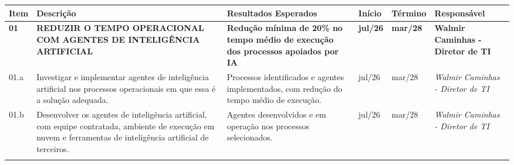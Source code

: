 \documentclass[12pt,a4paper]{article}
\newlength{\utilTab}
\newlength{\colItem}\newlength{\colDesc}\newlength{\colResul}
\newlength{\colIni}\newlength{\colFim}\newlength{\colResp}
\begin{document}
\begingroup
\footnotesize\singlespacing
{}
\setlength{\arrayrulewidth}{0.5pt}
\setlength{\tabcolsep}{1pt}
\renewcommand{\arraystretch}{1.35}
\setlength{\utilTab}{\dimexpr\textwidth-12\tabcolsep-7\arrayrulewidth\relax}
\setlength{\colItem}{0.04764\utilTab}
\setlength{\colDesc}{0.43812\utilTab}
\setlength{\colResul}{0.21902\utilTab}
\setlength{\colIni}{0.05409\utilTab}
\setlength{\colFim}{0.06101\utilTab}
\setlength{\colResp}{\dimexpr\utilTab-\colItem-\colDesc-\colResul-\colIni-\colFim\relax}
\begin{tabular}{|>{\centering\arraybackslash}p{\colItem}|>{\raggedright\arraybackslash}p{\colDesc}|>{\raggedright\arraybackslash}p{\colResul}|>{\centering\arraybackslash}p{\colIni}|>{\centering\arraybackslash}p{\colFim}|>{\centering\arraybackslash}p{\colResp}|}
\arrayrulecolor{bordaEscura}\hline\arrayrulecolor{bordaCinza}
\cellcolor{azulCabecalho}\fontsize{9.5}{11.5}\selectfont\bfseries Item &
\cellcolor{azulCabecalho}\centering\arraybackslash\fontsize{9.5}{11.5}\selectfont\bfseries Descrição &
\cellcolor{azulCabecalho}\centering\arraybackslash\fontsize{9.5}{11.5}\selectfont\bfseries Resultados Esperados &
\cellcolor{azulCabecalho}\fontsize{9.5}{11.5}\selectfont\bfseries Início &
\cellcolor{azulCabecalho}\fontsize{9.5}{11.5}\selectfont\bfseries Término &
\cellcolor{azulCabecalho}\fontsize{9.5}{11.5}\selectfont\bfseries Responsável \\
\hline
\cellcolor{azulTitulo}\bfseries\color{white}01 &
\cellcolor{azulTitulo}\bfseries\color{white}REDUZIR O TEMPO OPERACIONAL COM AGENTES DE INTELIGÊNCIA ARTIFICIAL &
\cellcolor{azulTitulo}\bfseries\color{white}Redução mínima de 20\% no tempo médio de execução dos processos apoiados por IA &
\cellcolor{azulTitulo}\bfseries\color{white}jul/26 &
\cellcolor{azulTitulo}\bfseries\color{white}mar/28 &
\cellcolor{azulTitulo}\bfseries\color{white}Walmir Caminhas - Diretor de TI \\
\hline
\cellcolor{azulClaro}01.a & \cellcolor{cinzaClaro}Investigar e implementar agentes de inteligência artificial nos processos operacionais em que essa é a solução adequada. & \cellcolor{cinzaClaro}Processos identificados e agentes implementados, com redução do tempo médio de execução. & \cellcolor{cinzaClaro}jul/26 & \cellcolor{cinzaClaro}mar/28 & \cellcolor{cinzaClaro}\itshape Walmir Caminhas - Diretor de TI \\
\hline
\cellcolor{azulClaro}01.b & \cellcolor{cinzaClaro}Desenvolver os agentes de inteligência artificial, com equipe contratada, ambiente de execução em nuvem e ferramentas de inteligência artificial de terceiros. & \cellcolor{cinzaClaro}Agentes desenvolvidos e em operação nos processos selecionados. & \cellcolor{cinzaClaro}jul/26 & \cellcolor{cinzaClaro}mar/28 & \cellcolor{cinzaClaro}\itshape Walmir Caminhas - Diretor de TI \\
\arrayrulecolor{bordaEscura}\hline
\end{tabular}
\endgroup
\end{document}
